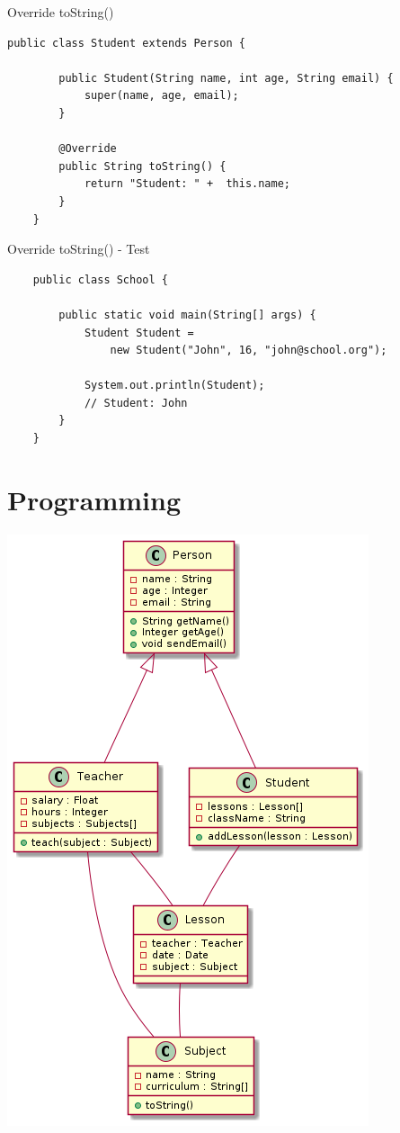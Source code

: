 \begin{frame}[fragile]{Override toString()}
	\begin{lstlisting}[escapechar=!]
	public class Student extends Person {

	    public Student(String name, int age, String email) {
	    	super(name, age, email);
	    }
	
	    @Override
	    public String toString() {
	        return "Student: " +  this.name;
	    }	
	}
	\end{lstlisting}
\end{frame}

\begin{frame}[fragile]{Override toString() - Test}
	\begin{lstlisting}
	public class School {
	    
	    public static void main(String[] args) {	    
	        Student Student = 
	            new Student("John", 16, "john@school.org");
	        
	        System.out.println(Student);
	        // Student: John
	    }
	}
	\end{lstlisting}
\end{frame}

\section{Programming}
\begin{frame}
	\begin{center}
		\includegraphics[height=\textheight]{04-inheritance/student_teacher_lesson.png}
	\end{center}

\end{frame}


